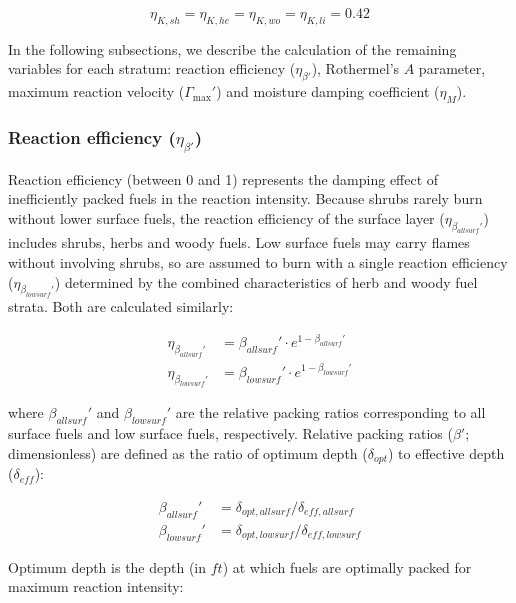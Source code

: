 \documentclass[]{book}
\begin{document}
\begin{equation}
\eta_{K,sh} = \eta_{K,he} =\eta_{K,wo} = \eta_{K,li} = 0.42
\end{equation}

In the following subsections, we describe the calculation of the
remaining variables for each stratum: reaction efficiency
(\(\eta_{\beta'}\)), Rothermel's \(A\) parameter, maximum reaction
velocity (\(\Gamma_{\max}'\)) and moisture damping coefficient
(\(\eta_{M}\)).

\subsubsection{\texorpdfstring{Reaction efficiency
(\(\eta_{\beta'}\))}{Reaction efficiency (\textbackslash{}eta\_\{\textbackslash{}beta'\})}}\label{reaction-efficiency-eta_beta}

Reaction efficiency (between 0 and 1) represents the damping effect of
inefficiently packed fuels in the reaction intensity. Because shrubs
rarely burn without lower surface fuels, the reaction efficiency of the
surface layer (\(\eta_{\beta_{allsurf}'}\)) includes shrubs, herbs and
woody fuels. Low surface fuels may carry flames without involving
shrubs, so are assumed to burn with a single reaction efficiency
(\(\eta_{\beta_{lowsurf}'}\)) determined by the combined characteristics
of herb and woody fuel strata. Both are calculated similarly:

\begin{eqnarray} 
\eta_{\beta_{allsurf}'} &= \beta_{allsurf}'\cdot e^{1- \beta_{allsurf}'}\\
\eta_{\beta_{lowsurf}'} &=\beta_{lowsurf}'\cdot e^{1- \beta_{lowsurf}'}
\label{eq:reacteff}
\end{eqnarray}

where \(\beta_{allsurf}'\) and \(\beta_{lowsurf}'\) are the relative
packing ratios corresponding to all surface fuels and low surface fuels,
respectively. Relative packing ratios (\(\beta'\); dimensionless) are
defined as the ratio of optimum depth (\(\delta_{opt}\)) to effective
depth (\(\delta_{eff}\)):

\begin{eqnarray} 
\beta_{allsurf}' &= \delta_{opt, allsurf} / \delta_{eff, allsurf} \\
\beta_{lowsurf}' &= \delta_{opt, lowsurf} / \delta_{eff, lowsurf}
\label{eq:relpacking}
\end{eqnarray}

Optimum depth is the depth (in \(ft\)) at which fuels are optimally
packed for maximum reaction intensity:
\end{document}
